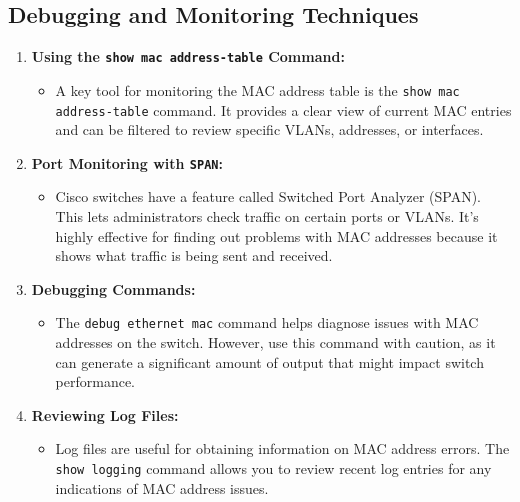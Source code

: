 \documentclass[11pt,a4paper]{article}
\begin{document}
\subsection*{Debugging and Monitoring Techniques}
\begin{enumerate}
        \item \textbf{Using the \lstinline{show mac address-table} Command:}
    \begin{itemize}
        \item A key tool for monitoring the MAC address table is the \lstinline{show mac address-table} command. It provides a clear view of current MAC entries and can be filtered to review specific VLANs, addresses, or interfaces.
    \end{itemize}

    \item \textbf{Port Monitoring with \lstinline{SPAN}:}
        \begin{itemize}
            \item Cisco switches have a feature called Switched Port Analyzer (SPAN). This lets administrators check traffic on certain ports or VLANs. It’s highly effective for finding out problems with MAC addresses because it shows what traffic is being sent and received.
        \end{itemize}

    \item \textbf{Debugging Commands:}
        \begin{itemize}
            \item The \lstinline{debug ethernet mac} command helps diagnose issues with MAC addresses on the switch. However, use this command with caution, as it can generate a significant amount of output that might impact switch performance.
        \end{itemize}

    \item \textbf{Reviewing Log Files:}
        \begin{itemize}
            \item Log files are useful for obtaining information on MAC address errors. The \lstinline{show logging} command allows you to review recent log entries for any indications of MAC address issues.
        \end{itemize}

\end{enumerate}
\end{document}
